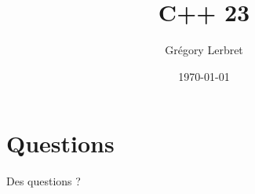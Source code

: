 \documentclass[t, 10pt]{beamer}
\author{Grégory Lerbret}
\title{C++ 23}
\date{\today}
\begin{document}
\frame[plain]{\maketitle}



\section*{Questions}
\begin{frame}[c]
	\begin{center}
		\huge Des questions ?
	\end{center}
\end{frame}


\end{document}
